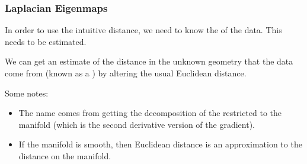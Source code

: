 \documentclass{beamer}
\begin{document}
\begin{frame}[fragile]
  \frametitle{Laplacian Eigenmaps}
  In order to use the intuitive distance, we need to know the  of the data.  This needs to be estimated.
  \vsp
  
  We can get an estimate of the distance in the unknown geometry that
  the data come from (known as a ) by altering the
  usual Euclidean distance. 
  
  \vsp
  Some notes:
  \begin{itemize}
  \item The name  comes from getting the
     decomposition of the  restricted to the
    manifold (which is the second derivative version of the gradient).
  \item If the manifold is smooth, then  Euclidean distance is an approximation
  to the distance on the manifold.
    \end{itemize}
\end{frame}




%
\end{document}
